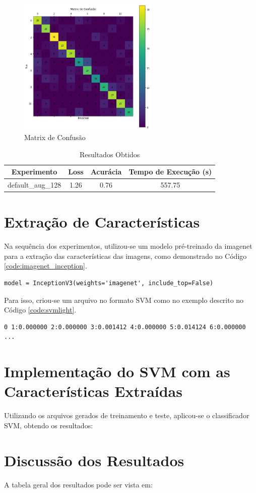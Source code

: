\documentclass[12pt]{article}
\begin{document}
\begin{figure}[!htb]
  \centering
  \includegraphics[width=18em]{experiments/lenet5_aug_128/confusion_matrix.png}
  \caption{Matrix de Confusão}
  \label{fig:experiment_lenet5_aug_128_confusion_matrix}
\end{figure}

\begin{table}[!htb]
  \centering
  \begin{tabular}{|c|c|c|c|}
    \hline
    \textbf{Experimento} & \textbf{Loss} & \textbf{Acurácia} & \textbf{Tempo de Execução (s)} \\ \hline
    default\_aug\_128    & 1.26          & 0.76              & 557.75                         \\ \hline
  \end{tabular}
  \caption{Resultados Obtidos}
  \label{tab:experiment_lenet_aug_128_reults}
\end{table}

\section{Extração de Características}

Na sequência dos experimentos, utilizou-se um modelo pré-treinado da imagenet para a extração das características das imagens, como demonstrado no Código \ref{code:imagenet_inception}.

\begin{lstlisting}[caption={ImageNet - InceptionV3},captionpos=b,frame=single,label={code:imagenet_inception}]
model = InceptionV3(weights='imagenet', include_top=False)
\end{lstlisting}

Para isso, criou-se um arquivo no formato SVM como no exemplo descrito no Código \ref{code:svmlight}.

\begin{lstlisting}[caption={Exemplo do Formato de Entrada},captionpos=b,frame=single,label={code:svmlight}]
0 1:0.000000 2:0.000000 3:0.001412 4:0.000000 5:0.014124 6:0.000000 ...
\end{lstlisting}

\section{Implementação do SVM com as Características Extraídas}

Utilizando os arquivos gerados de treinamento e teste, aplicou-se o classificador SVM, obtendo os resultados:

\section{Discussão dos Resultados}

A tabela geral dos resultados pode ser vista em:
\end{document}
